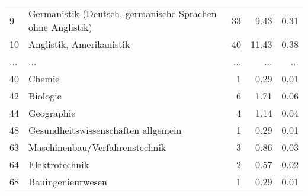 \begin{longtable}{lXrrr}
        9 & \multicolumn{1}{X}{Germanistik (Deutsch, germanische Sprachen ohne Anglistik)} & %
          \num{33} &
          \num[round-mode=places,round-precision=2]{9.43} &
          \num[round-mode=places,round-precision=2]{0.31} \\
        10 & \multicolumn{1}{X}{Anglistik, Amerikanistik} & %
          \num{40} &
          \num[round-mode=places,round-precision=2]{11.43} &
          \num[round-mode=places,round-precision=2]{0.38} \\
       ... & ... & ... & ... & ... \\
        40 & \multicolumn{1}{X}{Chemie} & %
          \num{1} &
          \num[round-mode=places,round-precision=2]{0.29} &
          \num[round-mode=places,round-precision=2]{0.01} \\

        42 & \multicolumn{1}{X}{Biologie} & %
          \num{6} &
          \num[round-mode=places,round-precision=2]{1.71} &
          \num[round-mode=places,round-precision=2]{0.06} \\

        44 & \multicolumn{1}{X}{Geographie} & %
          \num{4} &
          \num[round-mode=places,round-precision=2]{1.14} &
          \num[round-mode=places,round-precision=2]{0.04} \\

        48 & \multicolumn{1}{X}{Gesundheitswissenschaften allgemein} & %
          \num{1} &
          \num[round-mode=places,round-precision=2]{0.29} &
          \num[round-mode=places,round-precision=2]{0.01} \\

        63 & \multicolumn{1}{X}{Maschinenbau/Verfahrenstechnik} & %
          \num{3} &
          \num[round-mode=places,round-precision=2]{0.86} &
          \num[round-mode=places,round-precision=2]{0.03} \\

        64 & \multicolumn{1}{X}{Elektrotechnik} & %
          \num{2} &
          \num[round-mode=places,round-precision=2]{0.57} &
          \num[round-mode=places,round-precision=2]{0.02} \\

        68 & \multicolumn{1}{X}{Bauingenieurwesen} & %
          \num{1} &
          \num[round-mode=places,round-precision=2]{0.29} &
          \num[round-mode=places,round-precision=2]{0.01} \\


\end{longtable}
